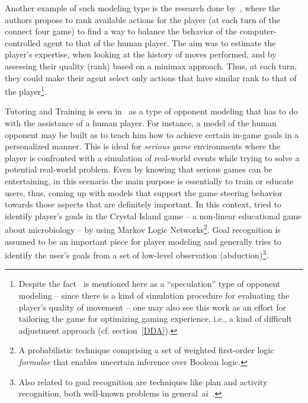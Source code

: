 Another example of such modeling type is the research done by~\cite{missura_online_2008}, where the authors propose to rank available actions for the player (at each turn of the connect four game) to find a way to balance the behavior of the computer-controlled agent to that of the human player. The aim was to estimate the player's expertise, when looking at the history of moves performed, and by assessing their quality (rank) based on a minimax approach.  Thus, at each turn, they could make their agent select only actions that have similar rank to that of the player\footnote{Despite the fact~\cite{missura_online_2008} is mentioned here as a ``speculation'' type of opponent modeling -- since there is a kind of simulation procedure for evaluating the player's quality of movement -- one may also see this work as an effort for tailoring the game for optimizing gaming experience, i.e., a kind of difficult adjustment approach (cf. section~\ref{DDA}).}.

Tutoring and Training is seen in~\cite{herik_opponent_2005} as a type of opponent modeling that has to do with the assistance of a human player. For instance, a model of the human opponent may be built as to teach him how to achieve certain in-game goals in a personalized manner. This is ideal for \textit{serious game} environments where the player is confronted with a simulation of real-world events while trying to solve a potential real-world problem. Even by knowing that serious games can be entertaining, in this scenario the main purpose is essentially to train or educate users, thus, coming up with models that support the game steering behavior towards those aspects that are definitely important. In this context, \cite{ha_goal_2011} tried to identify player's goals in the Crystal Island game -- a non-linear educational game about microbiology -- by using Markov Logic Networks\footnote{A probabilistic technique comprising a set of weighted first-order logic \textit{formulae} that enables uncertain inference over Boolean logic. }. Goal recognition is assumed to be an important piece for player modeling and generally tries to identify the user's goals from a set of low-level observation (abduction)\footnote{Also related to goal recognition are techniques like plan and activity recognition, both well-known problems in general~\gls{ai}~\cite{ha_goal_2011}.}. 

